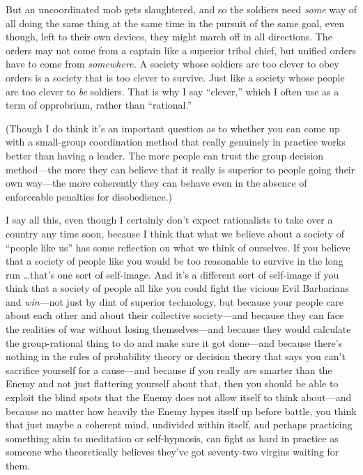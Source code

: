 {
 But an uncoordinated mob gets slaughtered, and so the soldiers
need \textit{some} way of all doing the same thing at the same time in
the pursuit of the same goal, even though, left to their own devices,
they might march off in all directions. The orders may not come from a
captain like a superior tribal chief, but unified orders have to come
from \textit{somewhere.} A society whose soldiers are too clever to
obey orders is a society that is too clever to survive. Just like a
society whose people are too clever to \textit{be} soldiers. That is
why I say ``clever,'' which I often
use as a term of opprobrium, rather than
``rational.''}

{
 (Though I do think it's an important question as
to whether you can come up with a small-group coordination method that
really genuinely in practice works better than having a leader. The
more people can trust the group decision method---the more they can
believe that it really is superior to people going their own way---the
more coherently they can behave even in the absence of enforceable
penalties for disobedience.)}

{
 I say all this, even though I certainly don't
expect rationalists to take over a country any time soon, because I
think that what we believe about a society of ``people
like us'' has some reflection on what we think of
ourselves. If you believe that a society of people like you would be
too reasonable to survive in the long run \ldots that's
one sort of self-image. And it's a different sort of
self-image if you think that a society of people all like you could
fight the vicious Evil Barbarians and \textit{win}{}---not just by dint
of superior technology, but because your people care about each other
and about their collective society---and because they can face the
realities of war without losing themselves---and because they would
calculate the group-rational thing to do and make sure it got
done---and because there's nothing in the rules of
probability theory or decision theory that says you
can't sacrifice yourself for a cause---and because if
you really \textit{are} smarter than the Enemy and not just flattering
yourself about that, then you should be able to exploit the blind spots
that the Enemy does not allow itself to think about---and because no
matter how heavily the Enemy hypes itself up before battle, you think
that just maybe a coherent mind, undivided within itself, and perhaps
practicing something akin to meditation or self-hypnosis, can fight as
hard in practice as someone who theoretically believes
they've got seventy-two virgins waiting for them.}

